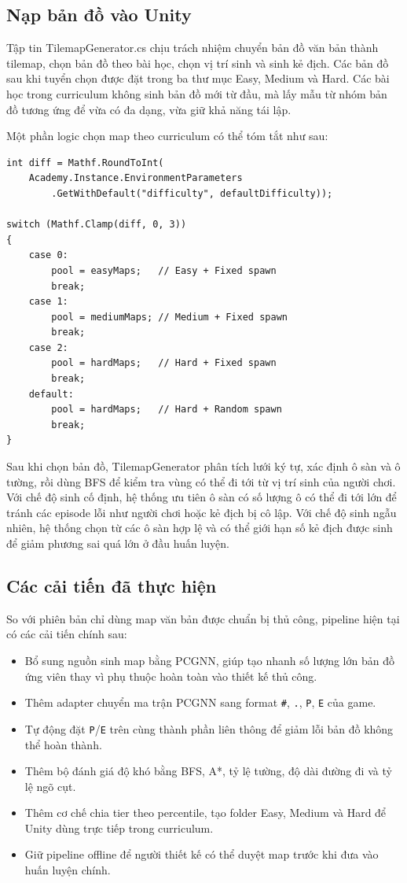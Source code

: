 \subsection{Nạp bản đồ vào Unity}

Tập tin TilemapGenerator.cs chịu trách nhiệm chuyển bản đồ văn bản thành tilemap, chọn bản đồ theo bài học, chọn vị trí sinh và sinh kẻ địch. Các bản đồ sau khi tuyển chọn được đặt trong ba thư mục Easy, Medium và Hard. Các bài học trong curriculum không sinh bản đồ mới từ đầu, mà lấy mẫu từ nhóm bản đồ tương ứng để vừa có đa dạng, vừa giữ khả năng tái lập.

Một phần logic chọn map theo curriculum có thể tóm tắt như sau:

\begin{lstlisting}
int diff = Mathf.RoundToInt(
    Academy.Instance.EnvironmentParameters
        .GetWithDefault("difficulty", defaultDifficulty));

switch (Mathf.Clamp(diff, 0, 3))
{
    case 0:
        pool = easyMaps;   // Easy + Fixed spawn
        break;
    case 1:
        pool = mediumMaps; // Medium + Fixed spawn
        break;
    case 2:
        pool = hardMaps;   // Hard + Fixed spawn
        break;
    default:
        pool = hardMaps;   // Hard + Random spawn
        break;
}
\end{lstlisting}

Sau khi chọn bản đồ, TilemapGenerator phân tích lưới ký tự, xác định ô sàn và ô tường, rồi dùng BFS để kiểm tra vùng có thể đi tới từ vị trí sinh của người chơi. Với chế độ sinh cố định, hệ thống ưu tiên ô sàn có số lượng ô có thể đi tới lớn để tránh các episode lỗi như người chơi hoặc kẻ địch bị cô lập. Với chế độ sinh ngẫu nhiên, hệ thống chọn từ các ô sàn hợp lệ và có thể giới hạn số kẻ địch được sinh để giảm phương sai quá lớn ở đầu huấn luyện.

\subsection{Các cải tiến đã thực hiện}

So với phiên bản chỉ dùng map văn bản được chuẩn bị thủ công, pipeline hiện tại có các cải tiến chính sau:

\begin{itemize}
    \item Bổ sung nguồn sinh map bằng PCGNN, giúp tạo nhanh số lượng lớn bản đồ ứng viên thay vì phụ thuộc hoàn toàn vào thiết kế thủ công.
    \item Thêm adapter chuyển ma trận PCGNN sang format \texttt{\#}, \texttt{.}, \texttt{P}, \texttt{E} của game.
    \item Tự động đặt \texttt{P}/\texttt{E} trên cùng thành phần liên thông để giảm lỗi bản đồ không thể hoàn thành.
    \item Thêm bộ đánh giá độ khó bằng BFS, A*, tỷ lệ tường, độ dài đường đi và tỷ lệ ngõ cụt.
    \item Thêm cơ chế chia tier theo percentile, tạo folder Easy, Medium và Hard để Unity dùng trực tiếp trong curriculum.
    \item Giữ pipeline offline để người thiết kế có thể duyệt map trước khi đưa vào huấn luyện chính.
\end{itemize}

